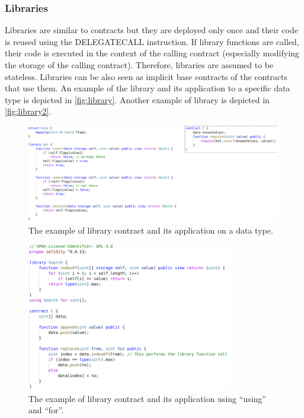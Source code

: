 \subsubsection{Libraries}\label{sec:libs}
Libraries are similar to contracts but they are deployed only once and their code is reused using the DELEGATECALL instruction.
If library functions are called, their code is executed in the context of the calling contract (especially modifying the storage of the calling contract).
Therefore, libraries are assumed to be stateless.
Libraries can be also seen as implicit base contracts of the contracts that use them.
An example of the library and its application to a specific data type is depicted in \autoref{fig:library}. 
Another example of library is depicted in \autoref{fig:library2}.


\begin{figure}[bt]
	\begin{center}
		\includegraphics[width=0.99\textwidth]{./figs/library.png}
		\caption{The example of library contract and its application on a data type.}		
		\label{fig:library}
	\end{center}	
\end{figure}

\begin{figure}[bt]
	\begin{center}
		\includegraphics[width=0.8\textwidth]{./figs/library2.png}
		\caption{The example of library contract and its application using ``using'' and ``for''.}		
		\label{fig:library2}
	\end{center}	
\end{figure}




